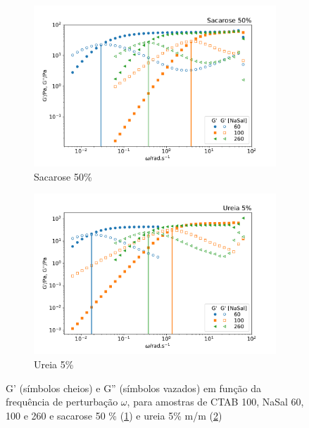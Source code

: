 	\begin{figure}[h]
		\begin{subfigure}[t]{0.5\textwidth}
			\centering
			\includegraphics[width=\textwidth]{imagens/reologia/oscilatorio_sac50p}
			\caption{Sacarose 50\%}
			\label{fig:oscilatorio_sac_50p}
		\end{subfigure} %
		\begin{subfigure}[t]{0.5\textwidth}
			\centering
			\includegraphics[width=\textwidth]{imagens/reologia/oscilatorio_ur5p}
			\caption{Ureia 5\%}
			\label{fig:oscilatorio_ur_5p}
		\end{subfigure} 
	\caption{G' (símbolos cheios) e G'' (símbolos vazados) em função da frequência de perturbação \(\omega\), para amostras de CTAB 100\mM{}, NaSal 60, 100 e 260\mM{} e sacarose 50 \% (\ref{fig:oscilatorio_sac_50p}) e ureia 5\% m/m (\ref{fig:oscilatorio_ur_5p})}
	\label{fig:oscilatorio_ur_sacarose}
	\end{figure}

